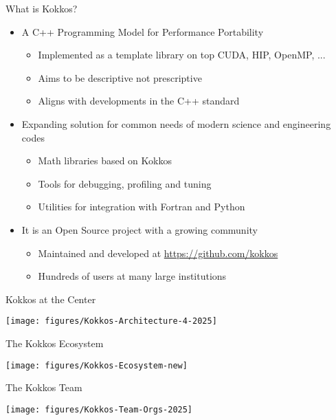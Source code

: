 \begin{frame}[fragile]{What is Kokkos?}
	\begin{itemize}
		\item A C++ Programming Model for Performance Portability
			\begin{itemize}
				\item Implemented as a template library on top CUDA, HIP, OpenMP, ...
				\item Aims to be descriptive not prescriptive
				\item Aligns with developments in the C++ standard
			\end{itemize}
		\item Expanding solution for common needs of modern science and engineering codes
			\begin{itemize}
				\item Math libraries based on Kokkos
				\item Tools for debugging, profiling and tuning
				\item Utilities for integration with Fortran and Python
			\end{itemize}
		\item It is an Open Source project with a growing community
			\begin{itemize}
				\item Maintained and developed at \url{https://github.com/kokkos}
				\item Hundreds of users at many large institutions
			\end{itemize}
	\end{itemize}
\end{frame}

\begin{frame}[fragile]{Kokkos at the Center}
  \begin{center}
    \texttt{[image: figures/Kokkos-Architecture-4-2025]}
  \end{center}
\end{frame}

\begin{frame}[fragile]{The Kokkos Ecosystem}
  \begin{center}
    \texttt{[image: figures/Kokkos-Ecosystem-new]}
  \end{center}
\end{frame}

\begin{frame}[fragile]{The Kokkos Team}
  \begin{center}
    \texttt{[image: figures/Kokkos-Team-Orgs-2025]}
  \end{center}
\end{frame}


